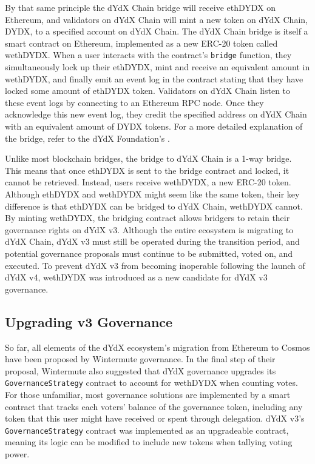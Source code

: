         By that same principle the dYdX Chain bridge will receive ethDYDX on Ethereum, and validators on dYdX Chain will mint a new token on dYdX Chain, DYDX, to a specified account on dYdX Chain. The dYdX Chain bridge is itself a smart contract on Ethereum, implemented as a new ERC-20 token called wethDYDX. When a user interacts with the contract's \texttt{bridge} function, they simultaneously lock up their ethDYDX, mint and receive an equivalent amount in wethDYDX, and finally emit an event log in the contract stating that they have locked some amount of ethDYDX token. Validators on dYdX Chain listen to these event logs by connecting to an Ethereum RPC node. Once they acknowledge this new event log, they credit the specified address on dYdX Chain with an equivalent amount of DYDX tokens. For a more detailed explanation of the bridge, refer to the dYdX Foundation's .

        Unlike most blockchain bridges, the bridge to dYdX Chain is a 1-way bridge. This means that once ethDYDX is sent to the bridge contract and locked, it cannot be retrieved. Instead, users receive wethDYDX, a new ERC-20 token. Although ethDYDX and wethDYDX might seem like the same token, their key difference is that ethDYDX can be bridged to dYdX Chain, wethDYDX cannot. By minting wethDYDX, the bridging contract allows bridgers to retain their governance rights on dYdX v3. Although the entire ecosystem is migrating to dYdX Chain, dYdX v3 must still be operated during the transition period, and potential governance proposals must continue to be submitted, voted on, and executed. To prevent dYdX v3 from becoming inoperable following the launch of dYdX v4, wethDYDX was introduced as a new candidate for dYdX v3 governance.

    \subsection{Upgrading v3 Governance}

        So far, all elements of the dYdX ecosystem's migration from Ethereum to Cosmos have been proposed by Wintermute governance. In the final step of their proposal, Wintermute also suggested that dYdX governance upgrades its \texttt{GovernanceStrategy} contract to account for wethDYDX when counting votes. For those unfamiliar, most governance solutions are implemented by a smart contract that tracks each voters' balance of the governance token, including any token that this user might have received or spent through delegation. dYdX v3's \texttt{GovernanceStrategy} contract was implemented as an upgradeable contract, meaning its logic can be modified to include new tokens when tallying voting power.

